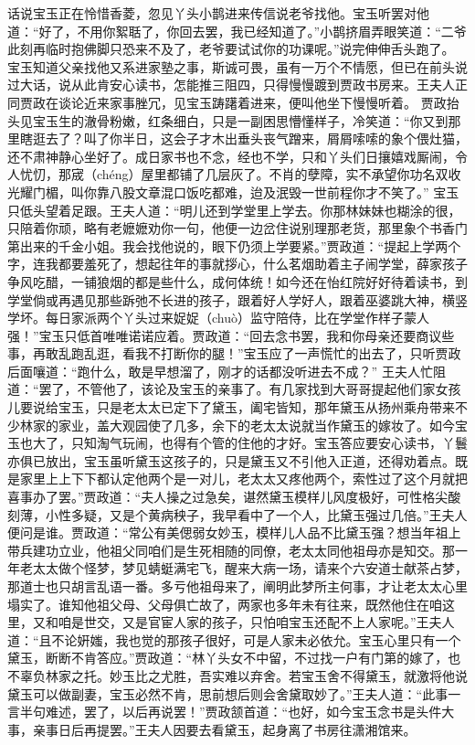 \documentclass[12pt,oneside]{book}
\begin{document}
话说宝玉正在怜惜香菱，忽见丫头小鹊进来传信说老爷找他。宝玉听罢对他道：“好了，不用你絮聒了，你回去罢，我已经知道了。”小鹊挤眉弄眼笑道：“二爷此刻再临时抱佛脚只恐来不及了，老爷要试试你的功课呢。”说完伸伸舌头跑了。
宝玉知道父亲找他又系进家塾之事，斯诚可畏，虽有一万个不情愿，但已在前头说过大话，说从此肯安心读书，怎能推三阻四，只得慢慢踱到贾政书房来。王夫人正同贾政在谈论近来家事脞冗，见宝玉踌躇着进来，便叫他坐下慢慢听着。
贾政抬头见宝玉生的澈骨粉嫩，红条细白，只是一副困思懵懂样子，冷笑道：“你又到那里瞎逛去了？叫了你半日，这会子才木出垂头丧气蹭来，屑屑嗦嗦的象个偎灶猫，还不肃神静心坐好了。成日家书也不念，经也不学，只和丫头们日攘嬉戏厮闹，令人忧忉，那宬（chéng）屋里都铺了几层灰了。不肖的孽障，实不承望你功名双收光耀门楣，叫你靠八股文章混口饭吃都难，迨及泯毁一世前程你才不笑了。”
宝玉只低头望着足跟。王夫人道：“明儿还到学堂里上学去。你那林妹妹也糊涂的很，只陪着你顽，略有老嬷嬷劝你一句，他便一边岔住说别理那老货，那里象个书香门第出来的千金小姐。我会找他说的，眼下仍须上学要紧。”贾政道：“提起上学两个字，连我都要羞死了，想起往年的事就拶心，什么茗烟助着主子闹学堂，薛家孩子争风吃醋，一铺狼烟的都是些什么，成何体统！如今还在怡红院好好待着读书，到学堂倘或再遇见那些跅弛不长进的孩子，跟着好人学好人，跟着巫婆跳大神，横竖学坏。每日家派两个丫头过来娖娖（chuò）监守陪侍，比在学堂作样子蒙人强！”宝玉只低首唯唯诺诺应着。贾政道：“回去念书罢，我和你母亲还要商议些事，再敢乱跑乱逛，看我不打断你的腿！”宝玉应了一声慌忙的出去了，只听贾政后面嚷道：“跑什么，敢是早想溜了，刚才的话都没听进去不成？”
王夫人忙阻道：“罢了，不管他了，该论及宝玉的亲事了。有几家找到大哥哥提起他们家女孩儿要说给宝玉，只是老太太已定下了黛玉，阖宅皆知，那年黛玉从扬州乘舟带来不少林家的家业，盖大观园使了几多，余下的老太太说就当作黛玉的嫁妆了。如今宝玉也大了，只知淘气玩闹，也得有个管的住他的才好。宝玉答应要安心读书，丫鬟亦俱已放出，宝玉虽听黛玉这孩子的，只是黛玉又不引他入正道，还得劝着点。既是家里上上下下都认定他两个是一对儿，老太太又疼他两个，索性过了这个月就把喜事办了罢。”贾政道：“夫人操之过急矣，谌然黛玉模样儿风度极好，可性格尖酸刻薄，小性多疑，又是个黄病秧子，我早看中了一个人，比黛玉强过几倍。”王夫人便问是谁。贾政道：“常公有美偲弱女妙玉，模样儿人品不比黛玉强？想当年祖上带兵建功立业，他祖父同咱们是生死相随的同僚，老太太同他祖母亦是知交。那一年老太太做个怪梦，梦见蜻蜓满宅飞，醒来大病一场，请来个六安道士献茶占梦，那道士也只胡言乱语一番。多亏他祖母来了，阐明此梦所主何事，才让老太太心里塌实了。谁知他祖父母、父母俱亡故了，两家也多年未有往来，既然他住在咱这里，又和咱是世交，又是官宦人家的孩子，只怕咱宝玉还配不上人家呢。”王夫人道：“且不论姸媸，我也觉的那孩子很好，可是人家未必依允。宝玉心里只有一个黛玉，断断不肯答应。”贾政道：“林丫头女不中留，不过找一户有门第的嫁了，也不辜负林家之托。妙玉比之尤胜，吾实难以弃舍。若宝玉舍不得黛玉，就激将他说黛玉可以做副妻，宝玉必然不肯，思前想后则会舍黛取妙了。”王夫人道：“此事一言半句难述，罢了，以后再说罢！”贾政颔首道：“也好，如今宝玉念书是头件大事，亲事日后再提罢。”王夫人因要去看黛玉，起身离了书房往潇湘馆来。
\end{document}
